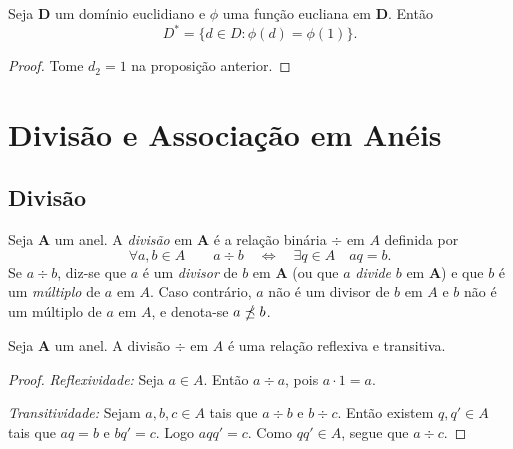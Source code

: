 \begin{prop}
	Seja $\bm D$ um domínio euclidiano e $\phi$ uma função eucliana em $\bm D$. Então
	\begin{equation*}
	D^* = \{d \in D : \phi(d)=\phi(1)\}.
	\end{equation*}
\end{prop}
\begin{proof}
	Tome $d_2=1$ na proposição anterior.
\end{proof}




\section{Divisão e Associação em Anéis}

\subsection{Divisão}

\begin{defi}
Seja $\bm A$ um anel. A \emph{divisão} em $\bm A$ é a relação binária $\div$ em $A$ definida por
	\begin{equation*}
	\forall a,b \in A \qquad a \div b \quad \Leftrightarrow \quad \exists q \in A \quad aq=b.
	\end{equation*}
Se $a \div b$, diz-se que $a$ é um \emph{divisor} de $b$ em $\bm A$ (ou que $a$ \emph{divide} $b$ em $\bm A$) e que $b$ é um \emph{múltiplo} de $a$ em $A$. Caso contrário, $a$ não é um divisor de $b$ em $A$ e $b$ não é um múltiplo de $a$ em $A$, e denota-se $a \npreceq b$.
\end{defi}

\begin{prop}
	Seja $\bm A$ um anel. A divisão $\div$ em $A$ é uma relação reflexiva e transitiva.
\end{prop}
\begin{proof}
	\emph{Reflexividade:} Seja $a \in A$. Então $a \div a$, pois $a \cdot 1 = a$.

	\emph{Transitividade:} Sejam $a,b,c \in A$ tais que $a \div b$ e $b \div c$. Então existem $q,q' \in A$ tais que $aq=b$ e $bq'=c$. Logo $aqq'=c$. Como $qq' \in A$, segue que $a \div c$.
\end{proof}


